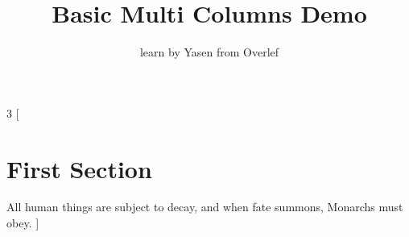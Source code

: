 \documentclass[]{article}
\title{Basic Multi Columns Demo}
\author{learn by Yasen from Overlef}
\begin{document}
	\maketitle
	
	\begin{multicols}{3}
		[
		\section{First Section}
		All human things are subject to decay, and when fate summons, Monarchs must obey.
		]
		\blindtext\blindtext
	\end{multicols}
\end{document}
